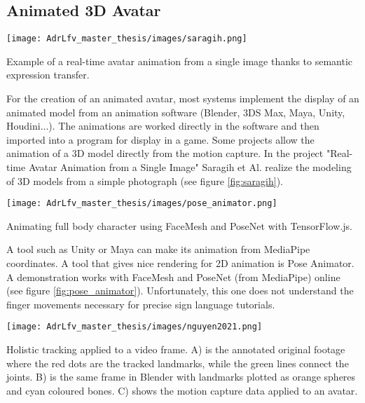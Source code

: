 \subsection{Animated 3D Avatar}

\begin{marginfigure}
    \centering
    \texttt{[image: AdrLfv\_master\_thesis/images/saragih.png]}
    \caption{Example of a real-time avatar animation from a single image thanks to semantic expression transfer.}
    \label{fig:saragih}
\end{marginfigure}

For the creation of an animated avatar, most systems implement the display of an animated model from an animation software (Blender, 3DS Max, Maya, Unity, Houdini...). The animations are worked directly in the software and then imported into a program for display in a game. 
Some projects allow the animation of a 3D model directly from the motion capture. In the project "Real-time Avatar Animation from a Single Image" \cite{saragih2011real} Saragih et Al. realize the modeling of 3D models from a simple photograph (see figure \ref{fig:saragih}). 

\begin{marginfigure}
    \centering
    \texttt{[image: AdrLfv\_master\_thesis/images/pose\_animator.png]}
    \caption{Animating full body character using FaceMesh and PoseNet with TensorFlow.js.}
    \label{fig:pose_animator}
\end{marginfigure}

A tool such as Unity or Maya can make its animation from MediaPipe coordinates. A tool that gives nice rendering for 2D animation is Pose Animator. A demonstration works with FaceMesh and PoseNet (from MediaPipe) online \cite{pose_animator} (see figure \ref{fig:pose_animator}). Unfortunately, this one does not understand the finger movements necessary for precise sign language tutorials.

\begin{marginfigure}
    \centering
    \texttt{[image: AdrLfv\_master\_thesis/images/nguyen2021.png]}
    \caption{Holistic tracking applied to a video frame. A) is the annotated original footage where
    the red dots are the tracked landmarks, while the green lines connect the joints. B) is the same
    frame in Blender with landmarks plotted as orange spheres and cyan coloured bones. C) shows
    the motion capture data applied to an avatar. \cite{nguyen2021automatic}}
    \label{fig:nguyen2021}
\end{marginfigure}

